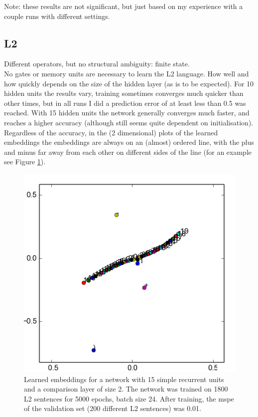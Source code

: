 \documentclass{article}
\begin{document}
\noindent Note: these results are not significant, but just based on my experience with a couple runs with different settings.\\

\subsection{L2}

Different operators, but no structural ambiguity: finite state.\\

\noindent No gates or memory units are necessary to learn the L2 language. 
How well and how quickly depends on the size of the hidden layer (as is to be expected).
For 10 hidden units the results vary, training sometimes converges much quicker than other times, but in all runs I did a prediction error of at least less than 0.5 was reached.
With 15 hidden units the network generally converges much faster, and reaches a higher accuracy (although still seems quite dependent on initialisation).\\

Regardless of the accuracy, in the (2 dimensional) plots of the learned embeddings the embeddings are always on an (almost) ordered line, with the plus and minus far away from each other on different sides of the line (for an example see Figure \ref{fig:L2_embeddings}).

\begin{figure}[!ht]
    \includegraphics{L2_embeddings.png}
    \caption{Learned embeddings for a network with 15 simple recurrent units and a comparison layer of size 2. The network was trained on 1800 L2 sentences for 5000 epochs, batch size 24. After training, the mspe of the validation set (200 different L2 sentences) was 0.01.}\label{fig:L2_embeddings}
\end{figure}
\end{document}

